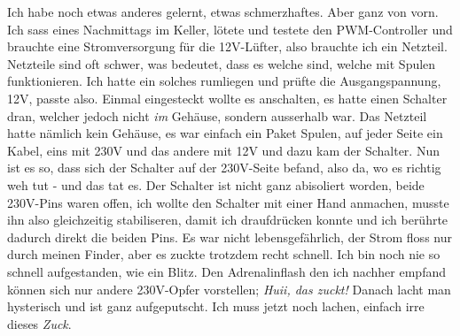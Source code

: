\documentclass[12pt,titlepage,a4paper]{article}
\begin{document}
Ich habe noch etwas anderes gelernt, etwas schmerzhaftes. Aber ganz von vorn. Ich sass eines Nachmittags im Keller, lötete und testete den PWM-Controller und brauchte eine Stromversorgung für die 12V-Lüfter, also brauchte ich ein Netzteil. Netzteile sind oft schwer, was bedeutet, dass es welche sind, welche mit Spulen funktionieren. Ich hatte ein solches rumliegen und prüfte die Ausgangspannung, 12V, passte also. Einmal eingesteckt wollte es anschalten, es hatte einen Schalter dran, welcher jedoch nicht \textit{im} Gehäuse, sondern ausserhalb war. Das Netzteil hatte nämlich kein Gehäuse, es war einfach ein Paket Spulen, auf jeder Seite ein Kabel, eins mit 230V und das andere mit 12V und dazu kam der Schalter. Nun ist es so, dass sich der Schalter auf der 230V-Seite befand, also da, wo es richtig weh tut - und das tat es. Der Schalter ist nicht ganz abisoliert worden, beide 230V-Pins waren offen, ich wollte den Schalter mit einer Hand anmachen, musste ihn also gleichzeitig stabiliseren, damit ich draufdrücken konnte und ich berührte dadurch direkt die beiden Pins. Es war nicht lebensgefährlich, der Strom floss nur durch meinen Finder, aber es zuckte trotzdem recht schnell. Ich bin noch nie so schnell aufgestanden, wie ein Blitz. Den Adrenalinflash den ich nachher empfand können sich nur andere 230V-Opfer vorstellen; \textit{Huii, das zuckt!} Danach lacht man hysterisch und ist ganz aufgeputscht. Ich muss jetzt noch lachen, einfach irre dieses 	\textit{Zuck}.
\end{document}
